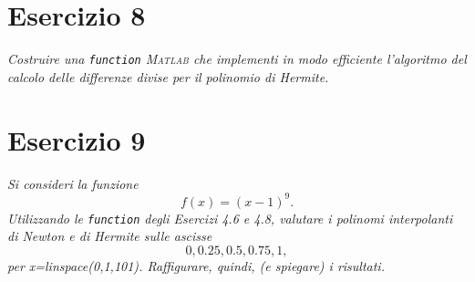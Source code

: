 
\section{Esercizio 8}
\label{sub:Esercizio 8}
\emph{Costruire una \lstinline{function} \textsc{Matlab} che implementi in modo efficiente l'algoritmo del calcolo delle differenze divise per il polinomio di Hermite.}
\begin{sol}
	
\end{sol}

\section{Esercizio 9}
\label{sub:Esercizio 9}
\emph{Si consideri la funzione
$$f(x)=(x-1)^9.$$
Utilizzando le \lstinline{function} degli Esercizi 4.6 e 4.8, valutare i polinomi interpolanti di Newton e di Hermite sulle ascisse
$$0,0.25,0.5,0.75,1,$$
per x=linspace(0,1,101). Raffigurare, quindi, (e spiegare) i risultati.}

